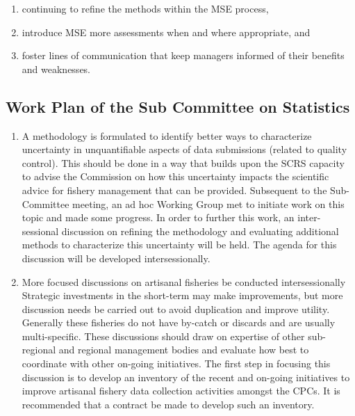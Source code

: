 \documentclass[a4paper,10pt]{article}
\begin{document}
\begin{enumerate}[1.]
\begin{enumerate}[(1)]
\item continuing to refine the methods within the MSE process, 
\item introduce MSE more assessments when and where appropriate, and 
\item foster lines of communication that keep managers informed of their benefits and weaknesses.
\end{enumerate}
\end{enumerate}

\newpage\printglossaries


\newpage
\subsection{Work Plan of the Sub Committee on Statistics}

\begin{enumerate}
 \item 	A methodology is formulated to identify better ways to characterize uncertainty in unquantifiable aspects of data submissions (related to quality control). This should be done in a way that builds upon the SCRS capacity to advise the Commission on how this uncertainty impacts the scientific advice for fishery management that can be provided. Subsequent to the Sub-Committee meeting, an ad hoc Working Group met to initiate work on this topic and made some progress. In order to further this work, an inter-sessional discussion on refining the methodology and evaluating additional methods to characterize this uncertainty will be held. The agenda for this discussion will be developed intersessionally.
 \item 	More focused discussions on artisanal fisheries be conducted intersessionally Strategic investments in the short-term may make improvements, but more discussion needs be carried out to avoid duplication and improve utility. Generally these fisheries do not have by-catch or discards and are usually multi-specific. These discussions should draw on expertise of other sub-regional and regional management bodies and evaluate how best to coordinate with other on-going initiatives. The first step in focusing this discussion is to develop an inventory of the recent and on-going initiatives to improve artisanal fishery data collection activities amongst the CPCs. It is recommended that a contract be made to develop such an inventory.
\end{enumerate}
\end{document}
